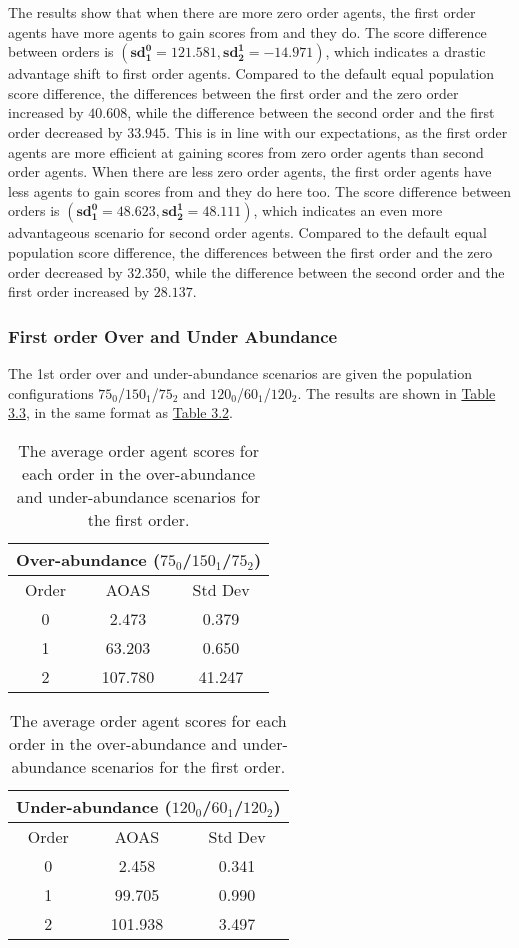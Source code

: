 The results show that when there are more zero order agents, the first order agents have more agents to gain scores from and they do. The score difference between orders is $(\mathbf{sd^0_1 = 121.581}, \mathbf{sd^1_2 = -14.971})$, which indicates a drastic advantage shift to first order agents. Compared to the default equal population score difference, the differences between the first order and the zero order increased by $\mathbf{40.608}$, while the difference between the second order and the first order decreased by $\mathbf{33.945}$. This is in line with our expectations, as the first order agents are more efficient at gaining scores from zero order agents than second order agents. When there are less zero order agents, the first order agents have less agents to gain scores from and they do here too. The score difference between orders is $(\mathbf{sd^0_1 = 48.623}, \mathbf{sd^1_2 = 48.111})$, which indicates an even more advantageous scenario for second order agents. Compared to the default equal population score difference, the differences between the first order and the zero order decreased by $\mathbf{32.350}$, while the difference between the second order and the first order increased by $\mathbf{28.137}$. 

\subsubsection{First order Over and Under Abundance}

The 1st order over and under-abundance scenarios are given the population configurations $75_{0}$/$150_{1}$/$75_{2}$ and $120_{0}$/$60_{1}$/$120_{2}$. The results are shown in \hyperref[table:non-sig-first-order-simple]{Table 3.3}, in the same format as \hyperref[table:non-sig-zero-order-simple]{Table 3.2}.

\begin{table}[h]
\centering
\begin{tabular}{|c|c|c|}
\hline
\multicolumn{3}{|c|}{Over-abundance ($75_{0}$/$150_{1}$/$75_{2}$)} \\
\hline
Order & AOAS & Std Dev \\
\hline
0     & 2.473    & 0.379    \\
1     & 63.203   & 0.650    \\
2     & 107.780  & 41.247   \\
\hline
\end{tabular}
\qquad
\begin{tabular}{|c|c|c|}
\hline
\multicolumn{3}{|c|}{Under-abundance ($120_{0}$/$60_{1}$/$120_{2}$)} \\
\hline
Order & AOAS & Std Dev \\
\hline
0     & 2.458   & 0.341  \\
1     & 99.705  & 0.990  \\
2     & 101.938 & 3.497  \\
\hline
\end{tabular}
\caption{The average order agent scores for each order in the over-abundance and under-abundance scenarios for the first order.}
\label{table:non-sig-first-order-simple}
\end{table}

